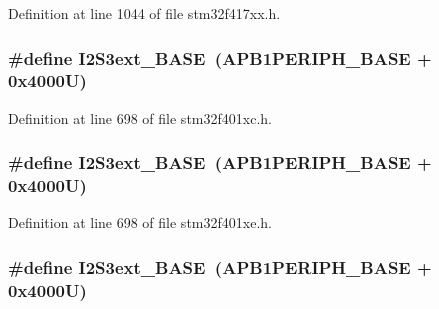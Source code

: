 Definition at line 1044 of file stm32f417xx.\+h.

\subsubsection[{\texorpdfstring{I2\+S3ext\+\_\+\+B\+A\+SE}{I2S3ext_BASE}}]{\setlength{\rightskip}{0pt plus 5cm}\#define I2\+S3ext\+\_\+\+B\+A\+SE~({\bf A\+P\+B1\+P\+E\+R\+I\+P\+H\+\_\+\+B\+A\+SE} + 0x4000\+U)}\hypertarget{group___peripheral__registers__structures_ga89b61d6e6b09e94f3fccb7bef34e0263}{}\label{group___peripheral__registers__structures_ga89b61d6e6b09e94f3fccb7bef34e0263}


Definition at line 698 of file stm32f401xc.\+h.

\subsubsection[{\texorpdfstring{I2\+S3ext\+\_\+\+B\+A\+SE}{I2S3ext_BASE}}]{\setlength{\rightskip}{0pt plus 5cm}\#define I2\+S3ext\+\_\+\+B\+A\+SE~({\bf A\+P\+B1\+P\+E\+R\+I\+P\+H\+\_\+\+B\+A\+SE} + 0x4000\+U)}\hypertarget{group___peripheral__registers__structures_ga89b61d6e6b09e94f3fccb7bef34e0263}{}\label{group___peripheral__registers__structures_ga89b61d6e6b09e94f3fccb7bef34e0263}


Definition at line 698 of file stm32f401xe.\+h.

\subsubsection[{\texorpdfstring{I2\+S3ext\+\_\+\+B\+A\+SE}{I2S3ext_BASE}}]{\setlength{\rightskip}{0pt plus 5cm}\#define I2\+S3ext\+\_\+\+B\+A\+SE~({\bf A\+P\+B1\+P\+E\+R\+I\+P\+H\+\_\+\+B\+A\+SE} + 0x4000\+U)}\hypertarget{group___peripheral__registers__structures_ga89b61d6e6b09e94f3fccb7bef34e0263}{}\label{group___peripheral__registers__structures_ga89b61d6e6b09e94f3fccb7bef34e0263}


